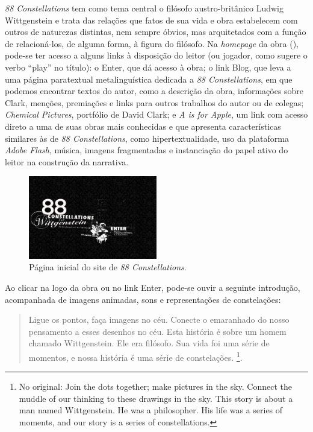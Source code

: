 \documentclass[portuguese]{textolivre}
\begin{document}
\emph{88 Constellations} tem como tema central o filósofo austro-britânico Ludwig Wittgenstein e trata das relações que fatos de sua vida e obra estabelecem com outros de naturezas distintas, nem sempre óbvios, mas arquitetados com a função de relacioná-los, de alguma forma, à figura do filósofo. Na \emph{homepage} da obra (), pode-se ter acesso a alguns links à disposição do leitor (ou jogador, como sugere o verbo “play” no título): o Enter, que dá acesso à obra; o link Blog, que leva a uma página paratextual metalinguística dedicada a \emph{88 Constellations}, em que podemos encontrar textos do autor, como a descrição da obra, informações sobre Clark, menções, premiações e links para outros trabalhos do autor ou de colegas; \emph{Chemical Pictures}, portfólio de David Clark; e \emph{A is for Apple}, um link com acesso direto a uma de suas obras mais conhecidas e que apresenta características similares às de \emph{88 Constellations}, como hipertextualidade, uso da plataforma \emph{Adobe Flash}, música, imagens fragmentadas e instanciação do papel ativo do leitor na construção da narrativa. 

\begin{figure}[htbp]
 \centering
 \includegraphics[width=0.5\textwidth]{Fig1[1].jpg}
 \caption{Página inicial do site de \emph{88 Constellations}.}
 \label{fig1}
\end{figure}

Ao clicar na logo da obra ou no link Enter, pode-se ouvir a seguinte introdução, acompanhada de imagens animadas, sons e representações de constelações: 

\begin{quote}
Ligue os pontos, faça imagens no céu. Conecte o emaranhado do nosso pensamento a esses desenhos no céu. Esta história é sobre um homem chamado Wittgenstein. Ele era filósofo. Sua vida foi uma série de momentos, e nossa história é uma série de constelações. \cite[n. p., tradução nossa]{clark2010}\footnote{No original: Join the dots together; make pictures in the sky. Connect the muddle of our thinking to these drawings in the sky. This story is about a man named Wittgenstein. He was a philosopher. His life was a series of moments, and our story is a series of constellations.}.
\end{quote}
\end{document}
